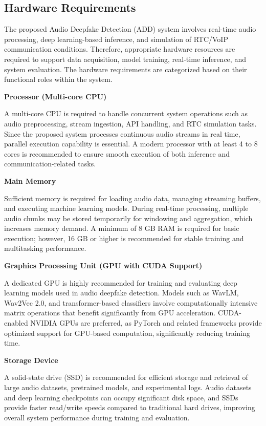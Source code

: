 \subsection{Hardware Requirements}

The proposed Audio Deepfake Detection (ADD) system involves real-time audio processing, deep learning-based inference, and simulation of RTC/VoIP communication conditions. Therefore, appropriate hardware resources are required to support data acquisition, model training, real-time inference, and system evaluation. The hardware requirements are categorized based on their functional roles within the system.

\textbf{Processor (Multi-core CPU)}

A multi-core CPU is required to handle concurrent system operations such as audio preprocessing, stream ingestion, API handling, and RTC simulation tasks. Since the proposed system processes continuous audio streams in real time, parallel execution capability is essential. A modern processor with at least 4 to 8 cores is recommended to ensure smooth execution of both inference and communication-related tasks.

\textbf{Main Memory}

Sufficient memory is required for loading audio data, managing streaming buffers, and executing machine learning models. During real-time processing, multiple audio chunks may be stored temporarily for windowing and aggregation, which increases memory demand. A minimum of 8 GB RAM is required for basic execution; however, 16 GB or higher is recommended for stable training and multitasking performance.

\textbf{Graphics Processing Unit (GPU with CUDA Support)}

A dedicated GPU is highly recommended for training and evaluating deep learning models used in audio deepfake detection. Models such as WavLM, Wav2Vec 2.0, and transformer-based classifiers involve computationally intensive matrix operations that benefit significantly from GPU acceleration. CUDA-enabled NVIDIA GPUs are preferred, as PyTorch and related frameworks provide optimized support for GPU-based computation, significantly reducing training time.

\textbf{Storage Device}

A solid-state drive (SSD) is recommended for efficient storage and retrieval of large audio datasets, pretrained models, and experimental logs. Audio datasets and deep learning checkpoints can occupy significant disk space, and SSDs provide faster read/write speeds compared to traditional hard drives, improving overall system performance during training and evaluation.

